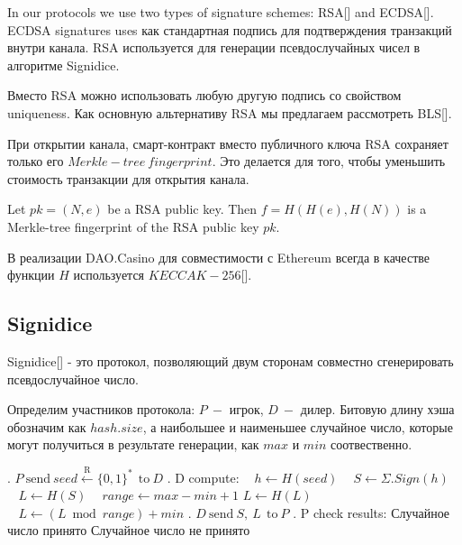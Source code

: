 In our protocols we use two types of signature schemes: RSA[] and ECDSA[]. ECDSA signatures uses как стандартная подпись для подтверждения транзакций внутри канала. RSA используется для генерации псевдослучайных чисел в алгоритме Signidice. 

\begin{remark}
Вместо RSA можно использовать любую другую подпись со свойством uniqueness. Как основную альтернативу RSA мы предлагаем рассмотреть BLS[].
\end{remark}

При открытии канала, смарт-контракт вместо публичного ключа RSA сохраняет только его $ Merkle-tree \ fingerprint$. Это делается для того, чтобы уменьшить стоимость транзакции для открытия канала. 
\begin{defn}
Let $pk = (N, e)$ be a RSA public key. Then $f = H(H(e), H(N))$ is a Merkle-tree fingerprint of the RSA public key $pk$. 
\end{defn}
\begin{remark}
В реализации DAO.Casino для совместимости с Ethereum всегда в качестве функции $H$ используется $KECCAK-256$[]. 
\end{remark}
	\subsection{Signidice}
	Signidice[] - это протокол, позволяющий двум сторонам совместно сгенерировать псевдослучайное число. 

Определим участников протокола: $P\ -$ игрок, $D \ -$ дилер. Битовую длину хэша обозначим как  $hash.size$, а наибольшее и наименьшее случайное число, которые могут получиться в результате генерации, как $max$ и $ min$ соотвественно.

\begin{algorithm} 
\caption*{$\textbf{Signidice}$} \label{alg:signidice}
\begin{algorithmic}
. $ P \ \text{send}\  seed\xleftarrow{\text{R}} \{0,1\}^* \  \ \text{to} \ D$
. D compute:
\State $\ \ \ \ h \gets H(seed)$
\State $\ \ \ \ S \gets  \Sigma . Sign(h)$
\State $\ \ \ \ L \gets H(S) $
\State $\ \ \ \ range \gets max - min +1$
\State$ L \gets H(L)$
\EndWhile
\State $ \ \ \ \  L \gets (L \bmod range) + min $
. $D \ \text{send}\  S, \ L \ \   \text{to} \ P$
. P check results:
\State Случайное число принято
\Else 
\State Случайное число не принято
\EndIf
\end{algorithmic}
\end{algorithm}

